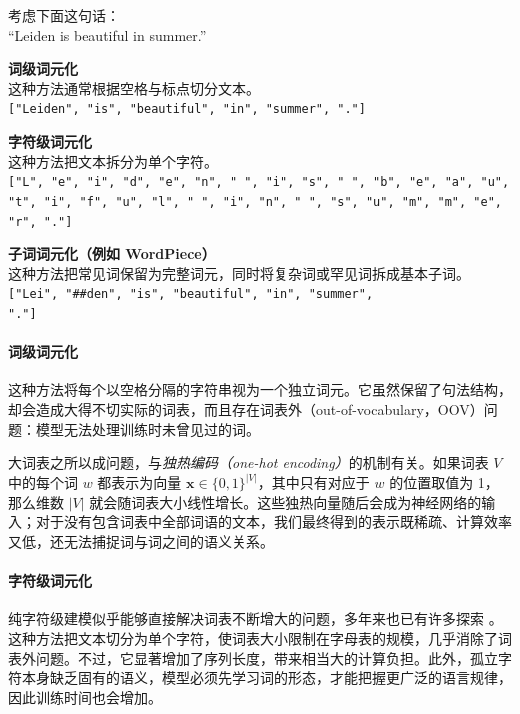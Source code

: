 \begin{example}[词元化策略]\label{ex:tokenization}
考虑下面这句话：\\ ``Leiden is beautiful in summer.''

\vspace{0.3cm}
\noindent\textbf{词级词元化} \\
这种方法通常根据空格与标点切分文本。\\
\vspace{0.1cm}
\noindent\texttt{["Leiden", "is", "beautiful", "in", "summer", "."]}

\vspace{0.4cm}
\noindent\textbf{字符级词元化} \\
这种方法把文本拆分为单个字符。\\
\vspace{0.1cm}
\noindent\texttt{["L", "e", "i", "d", "e", "n", " ", "i", "s", " ", "b", "e", "a", "u", "t", "i", "f", "u", "l", " ", "i", "n", " ", "s", "u", "m", "m", "e", "r", "."]}

\vspace{0.4cm}
\noindent\textbf{子词词元化（例如 WordPiece）} \\
这种方法把常见词保留为完整词元，同时将复杂词或罕见词拆成基本子词。\\
\vspace{0.1cm}
\noindent\texttt{["Lei", "\#\#den", "is", "beautiful", "in", "summer",}\\
\noindent\texttt{"."]}
\end{example}

\paragraph{词级词元化}
这种方法将每个以空格分隔的字符串视为一个独立词元。它虽然保留了句法结构，却会造成大得不切实际的词表，而且存在词表外（out-of-vocabulary，OOV）问题：模型无法处理训练时未曾见过的词。

大词表之所以成问题，与\emph{独热编码（one-hot encoding）}的机制有关。如果词表 $V$ 中的每个词 $w$ 都表示为向量 $\mathbf{x} \in \{0, 1\}^{|V|}$，其中只有对应于 $w$ 的位置取值为 1，那么维数 $|V|$ 就会随词表大小线性增长。这些独热向量随后会成为神经网络的输入；对于没有包含词表中全部词语的文本，我们最终得到的表示既稀疏、计算效率又低，还无法捕捉词与词之间的语义关系。

\paragraph{字符级词元化}
纯字符级建模似乎能够直接解决词表不断增大的问题，多年来也已有许多探索 \citep{mielke2021wordscharactersbriefhistory}。这种方法把文本切分为单个字符，使词表大小限制在字母表的规模，几乎消除了词表外问题。不过，它显著增加了序列长度，带来相当大的计算负担。此外，孤立字符本身缺乏固有的语义，模型必须先学习词的形态，才能把握更广泛的语言规律，因此训练时间也会增加。

